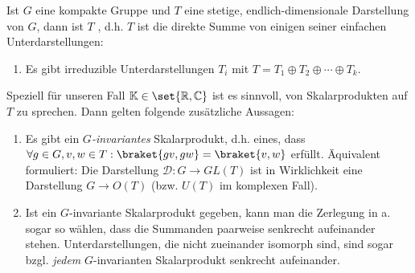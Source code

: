 \begin{theorem}\label{darstellungen:maschke}
Ist $G$ eine kompakte Gruppe und $T$ eine stetige, endlich-dimensionale Darstellung von $G$, dann ist $T$ , d.h. $T$ ist die direkte Summe von einigen seiner einfachen Unterdarstellungen:
\begin{enumerate}
\item Es gibt irreduzible Unterdarstellungen $T_i$ mit $T=T_1\oplus T_2\oplus\cdots\oplus T_k$.
\end{enumerate}

Speziell für unseren Fall $\IK\in\set{\IR,\IC}$ ist es sinnvoll, von Skalarprodukten auf $T$ zu sprechen. Dann gelten folgende zusätzliche Aussagen:
\begin{enumerate}[resume]
\item Es gibt ein \emph{$G$-invariantes} Skalarprodukt, d.h. eines, dass $\forall g\in G, v,w\in T: \braket{gv,gw} = \braket{v,w}$ erfüllt. Äquivalent formuliert: Die Darstellung $\mathcal{D}: G\to GL(T)$ ist in Wirklichkeit eine Darstellung $G\to O(T)$ (bzw. $U(T)$ im komplexen Fall).
\item Ist ein $G$-invariante Skalarprodukt gegeben, kann man die Zerlegung in a. sogar so wählen, dass die Summanden paarweise senkrecht aufeinander stehen. Unterdarstellungen, die nicht zueinander isomorph sind, sind sogar bzgl. \emph{jedem} $G$-invarianten Skalarprodukt senkrecht aufeinander.
\end{enumerate}
\end{theorem}
